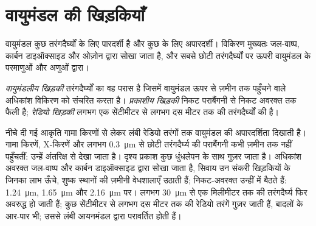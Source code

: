 \section{वायुमंडल की खिड़कियाँ}

वायुमंडल कुछ तरंगदैर्घ्यों के लिए पारदर्शी है और कुछ के लिए अपारदर्शी। विकिरण मुख्यतः जल-वाष्प,
कार्बन डाइऑक्साइड और ओज़ोन द्वारा सोखा जाता है, और सबसे छोटी तरंगदैर्घ्यों पर ऊपरी वायुमंडल
के परमाणुओं और अणुओं द्वारा।

\begin{definition}[वायुमंडलीय खिड़की]\label{def:b1:observing-the-sky:window}
\emph{वायुमंडलीय खिड़की} तरंगदैर्घ्यों का वह परास है जिसमें वायुमंडल
ऊपर से ज़मीन तक पहुँचने वाले अधिकांश विकिरण को संचरित करता है। \emph{प्रकाशीय खिड़की} निकट
पराबैंगनी से निकट अवरक्त तक फैली है; \emph{रेडियो खिड़की} लगभग एक सेंटीमीटर से लगभग दस मीटर
तक की तरंगदैर्घ्यों की है।
\end{definition}

नीचे दी गई आकृति गामा किरणों से लेकर लंबी रेडियो तरंगों तक वायुमंडल की अपारदर्शिता दिखाती है।
गामा किरणें, X-किरणें और लगभग \qty{0.3}{\micro\metre} से छोटी तरंगदैर्घ्य की पराबैंगनी कभी ज़मीन
तक नहीं पहुँचतीं: उन्हें अंतरिक्ष से देखा जाता है। दृश्य प्रकाश कुछ धुंधलेपन के साथ गुज़र जाता
है। अधिकांश अवरक्त जल-वाष्प और कार्बन डाइऑक्साइड द्वारा सोखा जाता है, सिवाय उन संकरी
खिड़कियों के जिनका लाभ ऊँचे, शुष्क स्थानों की ज़मीनी वेधशालाएँ उठाती हैं; निकट-अवरक्त  उन्हीं में बैठते हैं: \qty{1.24}{\micro\metre}, \qty{1.65}{\micro\metre} और
\qty{2.16}{\micro\metre} पर। लगभग \qty{30}{\micro\metre} से एक मिलीमीटर तक की तरंगदैर्घ्य फिर
अवरुद्ध हो जाती हैं; कुछ सेंटीमीटर से लगभग दस मीटर तक की रेडियो तरंगें गुज़र जाती हैं, बादलों
के आर-पार भी; उससे लंबी आयनमंडल द्वारा परावर्तित होती हैं।

